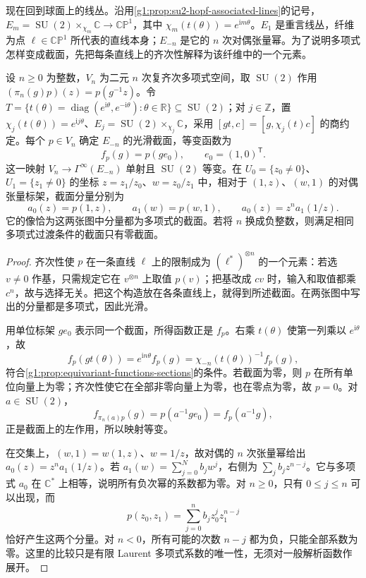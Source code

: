 现在回到球面上的线丛。沿用\cref{g1:prop:su2-hopf-associated-lines}的记号，\(E_m=\operatorname{SU}(2)\times_{\chi_m}\mathbb C\to\mathbb{CP}^1\)，其中 \(\chi_m(t(\theta))=e^{\mathrm{i}m\theta}\)。\(E_1\) 是重言线丛，纤维为点 \(\ell\in\mathbb{CP}^1\) 所代表的直线本身；\(E_{-n}\) 是它的 \(n\) 次对偶张量幂。为了说明多项式怎样变成截面，先把每条直线上的齐次性解释为该纤维中的一个元素。

\begin{proposition}\label{g1:prop:polynomial-sections-sphere-line}
	设 \(n\ge0\) 为整数，\(V_n\) 为二元 \(n\) 次复齐次多项式空间，取 \(\operatorname{SU}(2)\) 作用 \((\pi_n(g)p)(z)=p(g^{-1}z)\)。令 \(T=\{t(\theta)=\operatorname{diag}(e^{\mathrm{i}\theta},e^{-\mathrm{i}\theta}):\theta\in\mathbb R\}\subseteq\operatorname{SU}(2)\)；对 \(j\in\mathbb Z\)，置 \(\chi_j(t(\theta))=e^{\mathrm{i}j\theta}\)、\(E_j=\operatorname{SU}(2)\times_{\chi_j}\mathbb C\)，采用 \([gt,c]=[g,\chi_j(t)c]\) 的商约定。每个 \(p\in V_n\) 确定 \(E_{-n}\) 的光滑截面，等变函数为
	\[
		f_p(g)=p(ge_0),\qquad e_0=(1,0)^{\mathsf T}.
	\]
	这一映射 \(V_n\to\Gamma^\infty(E_{-n})\) 单射且 \(\operatorname{SU}(2)\) 等变。在 \(U_0=\{z_0\ne0\}\)、\(U_1=\{z_1\ne0\}\) 的坐标 \(z=z_1/z_0\)、\(w=z_0/z_1\) 中，相对于 \((1,z)\)、\((w,1)\) 的对偶张量标架，截面分量分别为
	\[
		a_0(z)=p(1,z),\qquad a_1(w)=p(w,1),\qquad
		a_0(z)=z^n a_1(1/z).
	\]
	它的像恰为这两张图中分量都为多项式的截面。若将 \(n\) 换成负整数，则满足相同多项式过渡条件的截面只有零截面。
\end{proposition}
\begin{proof}
	齐次性使 \(p\) 在一条直线 \(\ell\) 上的限制成为 \((\ell^*)^{\otimes n}\) 的一个元素：若选 \(v\ne0\) 作基，只需规定它在 \(v^{\otimes n}\) 上取值 \(p(v)\)；把基改成 \(cv\) 时，输入和取值都乘 \(c^n\)，故与选择无关。把这个构造放在各条直线上，就得到所述截面。在两张图中写出的分量都是多项式，因此光滑。

	用单位标架 \(ge_0\) 表示同一个截面，所得函数正是 \(f_p\)。右乘 \(t(\theta)\) 使第一列乘以 \(e^{\mathrm{i}\theta}\)，故
	\[
		f_p(gt(\theta))=e^{\mathrm{i}n\theta}f_p(g)
		=\chi_{-n}(t(\theta))^{-1}f_p(g),
	\]
	符合\cref{g1:prop:equivariant-functions-sections}的条件。若截面为零，则 \(p\) 在所有单位向量上为零；齐次性使它在全部非零向量上为零，也在零点为零，故 \(p=0\)。对 \(a\in\operatorname{SU}(2)\)，
	\[
		f_{\pi_n(a)p}(g)=p(a^{-1}ge_0)=f_p(a^{-1}g),
	\]
	正是截面上的左作用，所以映射等变。

	在交集上，\((w,1)=w(1,z)\)、\(w=1/z\)，故对偶的 \(n\) 次张量幂给出 \(a_0(z)=z^n a_1(1/z)\)。若 \(a_1(w)=\sum_{j=0}^N b_jw^j\)，右侧为 \(\sum_j b_jz^{n-j}\)。它与多项式 \(a_0\) 在 \(\mathbb C^*\) 上相等，说明所有负次幂的系数都为零。对 \(n\ge0\)，只有 \(0\le j\le n\) 可以出现，而
	\[
		p(z_0,z_1)=\sum_{j=0}^n b_j z_0^jz_1^{n-j}
	\]
	恰好产生这两个分量。对 \(n<0\)，所有可能的次数 \(n-j\) 都为负，只能全部系数为零。这里的比较只是有限 Laurent 多项式系数的唯一性，无须对一般解析函数作展开。
\end{proof}

